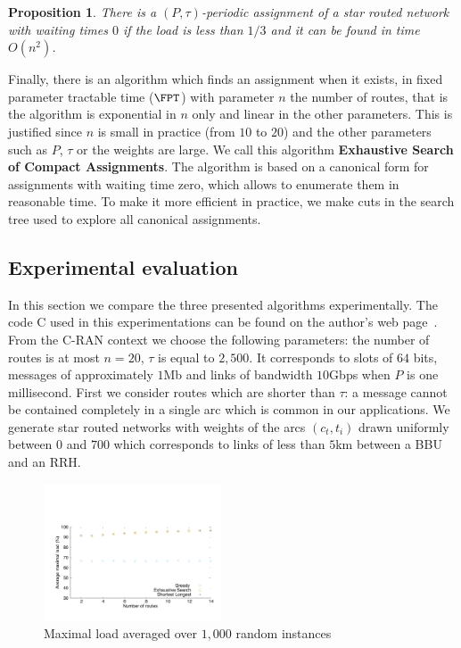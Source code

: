 \documentclass[a4paper,10pt]{IEEEtran}
\newtheorem{proposition}{Proposition}
\begin{document}
      \begin{proposition}
    There is a $(P,\tau)$-periodic assignment of a star routed network with waiting times $0$ if the load is less than $1/3$ and it can be found in time $O(n^2)$.
    \end{proposition}
    
Finally, there is an algorithm which finds an assignment when it exists, in fixed parameter tractable time ($\FPT$) with parameter $n$ the number of routes, that is the algorithm is exponential in $n$ only and linear in the other parameters. This is justified since $n$ is small in practice (from $10$ to $20$) and the other parameters such as $P$, $\tau$ or the weights are large. We call this algorithm \textbf{Exhaustive Search of Compact Assignments}. The algorithm is based on a canonical form for assignments with waiting time zero, which allows to enumerate them in reasonable time. To make it more efficient in practice, we make cuts in the search tree used to explore all canonical assignments. 

   \subsection{Experimental evaluation}\label{sec:exp_PAZL}
   
   In this section we compare the three presented algorithms experimentally. The code C used in this experimentations can be found on the author's web page~\cite{yannsite}.  From the C-RAN context we choose the following parameters: the number of routes is at most $n = 20$, $\tau$ is equal to $2,500$. It corresponds to slots of $64$ bits, messages of approximately $1$Mb and links of bandwidth $10$Gbps when $P$ is one millisecond. 
      First we consider routes which are shorter than $\tau$: a message cannot be contained completely in a single arc which is common in our applications. We generate star routed networks with weights of the arcs $(c_t,t_i)$ drawn uniformly between $0$ and $700$ which corresponds to links of less than $5$km between a BBU and an RRH. 

        
      \begin{figure}[h]
      \begin{center}
	 \includegraphics[width=0.47\textwidth]{periode_petite.pdf}
      \end{center}
      \caption{Maximal load averaged over $1,000$ random instances}\label{fig:short}
      \end{figure}
      
\end{document}
